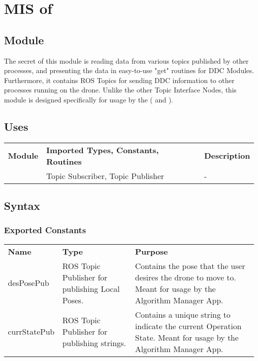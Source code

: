 \documentclass[12pt, titlepage]{article}
\begin{document}
\section{MIS of } \label{MIS_DDC_TI} 
\subsection{Module}
The secret of this module is reading data from various topics published by other processes, and presenting the data in easy-to-use "get" routines for DDC Modules. Furthermore, it contains ROS Topics for sending DDC information to other processes running on the drone. Unlike the other Topic Interface Nodes, this module is designed specifically for usage by the  ( and ). \subsection{Uses}
\begin{center}
\begin{tabular}{p{2 cm} p{5cm} p{6.5cm} } 
\hline
\textbf{Module} & \textbf{Imported Types, Constants, Routines} & \textbf{Description} \\
\nameref{ROS} & Topic Subscriber, Topic Publisher & - \\
\hline
\hline
\end{tabular}
\end{center}
\subsection{Syntax}
\subsubsection{Exported Constants}
\begin{center}
\begin{tabular}{p{3.5cm} p{2.5cm} p{8cm}}
\hline
\textbf{Name} & \textbf{Type} & \textbf{Purpose} \\
desPosePub  & ROS Topic Publisher for publishing Local Poses. &  Contains the pose that the user desires the drone to move to. Meant for usage by the Algorithm Manager App. \\
currStatePub  & ROS Topic Publisher for publishing strings. &  Contains a unique string to indicate the current Operation State. Meant for usage by the Algorithm Manager App. \\
\hline
\hline
\end{tabular}
\end{center}
\end{document}
